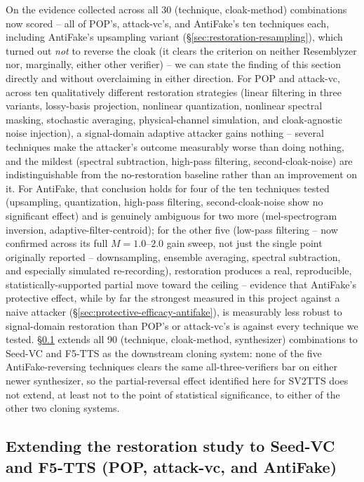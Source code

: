 \documentclass[11pt]{article}
\begin{document}
On the evidence collected across all 30 (technique, cloak-method)
combinations now scored -- all of POP's, attack-vc's, and AntiFake's
ten techniques each, including AntiFake's upsampling variant
(\S\ref{sec:restoration-resampling}), which turned out \emph{not} to
reverse the cloak (it clears the criterion on neither Resemblyzer nor,
marginally, either other verifier) -- we can state the finding of this
section directly and without overclaiming in either direction. For POP
and attack-vc, across ten qualitatively different restoration
strategies (linear filtering in three variants, lossy-basis projection,
nonlinear quantization, nonlinear spectral masking, stochastic
averaging, physical-channel simulation, and cloak-agnostic noise
injection), a signal-domain adaptive attacker gains nothing -- several
techniques make the attacker's outcome measurably worse than doing
nothing, and the mildest (spectral subtraction, high-pass filtering,
second-cloak-noise) are indistinguishable from the no-restoration
baseline rather than an improvement on it. For AntiFake, that
conclusion holds for four of the ten techniques tested (upsampling,
quantization, high-pass filtering, second-cloak-noise show no
significant effect) and is genuinely ambiguous for two more
(mel-spectrogram inversion, adaptive-filter-centroid); for the other
five (low-pass filtering -- now confirmed across its full
$M=1.0$--$2.0$ gain sweep, not just the single point originally
reported -- downsampling, ensemble averaging, spectral subtraction, and
especially simulated re-recording), restoration produces a real,
reproducible, statistically-supported partial move toward the ceiling
-- evidence that AntiFake's protective effect, while by far the
strongest measured in this project against a naive attacker
(\S\ref{sec:protective-efficacy-antifake}), is measurably less robust to
signal-domain restoration than POP's or attack-vc's is against every
technique we tested. \S\ref{sec:restoration-seedvc-f5tts} extends all
90 (technique, cloak-method, synthesizer) combinations to Seed-VC and
F5-TTS as the downstream cloning system: none of the five
AntiFake-reversing techniques clears the same all-three-verifiers bar
on either newer synthesizer, so the partial-reversal effect identified
here for SV2TTS does not extend, at least not to the point of
statistical significance, to either of the other two cloning systems.

\subsection{Extending the restoration study to Seed-VC and F5-TTS (POP, attack-vc, and AntiFake)}
\label{sec:restoration-seedvc-f5tts}
\end{document}
